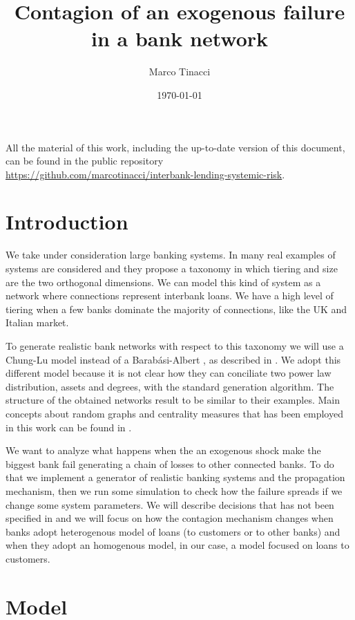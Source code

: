 \documentclass[a4paper, 11pt]{article}
\begin{document}
\title{Contagion of an exogenous failure in a bank network}
\date{\today}
\author{Marco Tinacci}
\maketitle

All the material of this work, including the up-to-date version of this document, can be found in the public repository \url{https://github.com/marcotinacci/interbank-lending-systemic-risk}.

\section{Introduction} %
\label{sec:introduction}
We take under consideration large banking systems. In \cite{KrauseGiansante} many real examples of systems are considered and they propose a taxonomy in which tiering and size are the two orthogonal dimensions. We can model this kind of system as a network where connections represent interbank loans. We have a high level of tiering when a few banks dominate the majority of connections, like the UK and Italian market.

To generate realistic bank networks with respect to this taxonomy we will use a Chung-Lu model \cite{ChungLu} instead of a Barabási-Albert \cite{barabasi1999emergence}, as described in \cite{KrauseGiansante}. We adopt this different model because it is not clear how they can conciliate two power law distribution, assets and degrees, with the standard generation algorithm. The structure of the obtained networks result to be similar to their examples. Main concepts about random graphs and centrality measures that has been employed in this work can be found in \cite{Newman}.

We want to analyze what happens when the an exogenous shock make the biggest bank fail generating a chain of losses to other connected banks. To do that we implement a generator of realistic banking systems and the propagation mechanism, then we run some simulation to check how the failure spreads if we change some system parameters. We will describe decisions that has not been specified in \cite{KrauseGiansante} and we will focus on how the contagion mechanism changes when banks adopt heterogenous model of loans (to customers or to other banks) and when they adopt an homogenous model, in our case, a model focused on loans to customers.


\section{Model} %
\label{sec:model}
\end{document}

